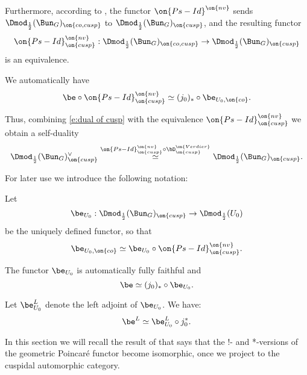 \documentclass[9pt]{amsart}
\theoremstyle{remark}
\theoremstyle{definition}
\theoremstyle{remark}
\numberwithin{equation}{section}
\begin{document}
\sssec{}

Furthermore, according to \cite[Theorem 2.2.7]{Ga1}, the functor $\on{Ps-Id}^{\on{nv}}$ sends 
$\Dmod_{\frac{1}{2}}(\Bun_G)_{\on{co,cusp}}$ to $\Dmod_{\frac{1}{2}}(\Bun_G)_{\on{cusp}}$, and the resulting functor
$$\on{Ps-Id}^{\on{nv}}_{\on{cusp}}:\Dmod_{\frac{1}{2}}(\Bun_G)_{\on{co,cusp}}\to \Dmod_{\frac{1}{2}}(\Bun_G)_{\on{cusp}}$$
is an equivalence. 

\medskip

We automatically have 
\begin{equation} \label{e:be via U}
\be\circ \on{Ps-Id}^{\on{nv}}_{\on{cusp}}\simeq (j_0)_*\circ \be_{U_0,\on{co}}. 
\end{equation}

\sssec{}

Thus, combining \eqref{e:dual of cusp} with the equivalence $\on{Ps-Id}^{\on{nv}}_{\on{cusp}}$ we obtain a self-duality
\begin{equation} \label{e:cusp self-dual}
\Dmod_{\frac{1}{2}}(\Bun_G)_{\on{cusp}}^\vee \overset{\on{Ps-Id}^{\on{nv}}_{\on{cusp}}\circ \bD^{\on{Verdier}}_{\on{cusp}}}\simeq 
\Dmod_{\frac{1}{2}}(\Bun_G)_{\on{cusp}}.
\end{equation} 

\sssec{}

For later use we introduce the following notation: 

\medskip

Let 
\begin{equation} \label{e:eU 0}
\be_{U_0}:\Dmod_{\frac{1}{2}}(\Bun_G)_{\on{cusp}}\to \Dmod_{\frac{1}{2}}(U_0)
\end{equation} 
be the uniquely defined functor, so that 
$$\be_{U_0,\on{co}}\simeq \be_{U_0}\circ \on{Ps-Id}^{\on{nv}}_{\on{cusp}}.$$

The functor $\be_{U_0}$ is automatically fully faithful and 
$$\be\simeq (j_0)_*\circ \be_{U_0}.$$

Let $\be^L_{U_0}$ denote the left adjoint of $\be_{U_0}$. We have:
\begin{equation} \label{e:e L via U}
\be^L\simeq \be^L_{U_0}\circ j_0^*.
\end{equation} 


In this section we will recall the result of \cite{Lin} that says that the !- and *-versions of the geometric Poincar\'e functor become
isomorphic, once we project to the cuspidal automorphic category. 
\end{document}
